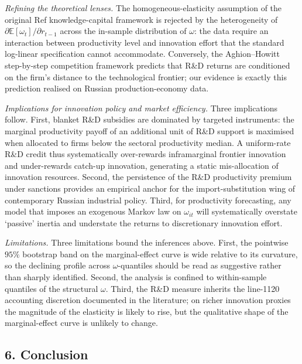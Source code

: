 \documentclass[a4paper, 12pt]{article}
\def\textcite#1{Ref}%
\begin{document}
\emph{Refining the theoretical lenses.} The homogeneous-elasticity assumption of the original \textcite{griliches1979issues} knowledge-capital framework is rejected by the heterogeneity of $\partial \mathbb{E}[\omega_t]/\partial r_{t-1}$ across the in-sample distribution of $\omega$: the data require an interaction between productivity level and innovation effort that the standard log-linear specification cannot accommodate. Conversely, the Aghion--Howitt step-by-step competition framework predicts that R\&D returns are conditioned on the firm's distance to the technological frontier; our evidence is exactly this prediction realised on Russian production-economy data.

\emph{Implications for innovation policy and market efficiency.} Three implications follow. First, blanket R\&D subsidies are dominated by targeted instruments: the marginal productivity payoff of an additional unit of R\&D support is maximised when allocated to firms below the sectoral productivity median. A uniform-rate R\&D credit thus systematically over-rewards inframarginal frontier innovation and under-rewards catch-up innovation, generating a static mis-allocation of innovation resources. Second, the persistence of the R\&D productivity premium under sanctions provides an empirical anchor for the import-substitution wing of contemporary Russian industrial policy. Third, for productivity forecasting, any model that imposes an exogenous Markov law on $\omega_{it}$ will systematically overstate `passive' inertia and understate the returns to discretionary innovation effort.

\emph{Limitations.} Three limitations bound the inferences above. First, the pointwise $95\%$ bootstrap band on the marginal-effect curve is wide relative to its curvature, so the declining profile across $\omega$-quantiles should be read as suggestive rather than sharply identified. Second, the analysis is confined to within-sample quantiles of the structural $\omega$. Third, the R\&D measure inherits the line-1120 accounting discretion documented in the literature; on richer innovation proxies the magnitude of the elasticity is likely to rise, but the qualitative shape of the marginal-effect curve is unlikely to change.

\subsection{6. Conclusion}
\end{document}
